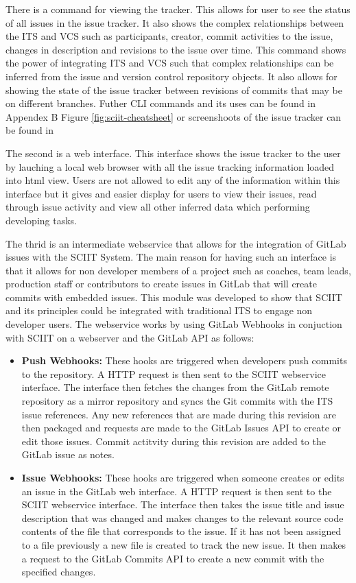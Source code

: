 \documentclass{mproj}
\begin{document}
There is a command for viewing the tracker. This allows for user to see the status of all issues in the issue tracker. It also shows the complex relationships between the ITS and VCS such as participants, creator, commit activities to the issue, changes in description and revisions to the issue over time. This command shows the power of integrating ITS and VCS such that complex relationships can be inferred from the issue and version control repository objects. It also allows for showing the state of the issue tracker between revisions of commits that may be on different branches. Futher CLI commands and its uses can be found in Appendex B Figure \ref{fig:sciit-cheatsheet} or screenshoots of the issue tracker can be found in %

The second is a web interface. This interface shows the issue tracker to the user by lauching a local web browser with all the issue tracking information loaded into html view. Users are not allowed to edit any of the information within this interface but it gives and easier display for users to view their issues, read through issue activity and view all other inferred data which performing developing tasks.

The thrid is an intermediate webservice that allows for the integration of GitLab issues with the SCIIT System. The main reason for having such an interface is that it allows for non developer members of a project such as coaches, team leads, production staff or contributors to create issues in GitLab that will create commits with embedded issues. This module was developed to show that SCIIT and its principles could be integrated with traditional ITS to engage non developer users. The webservice works by using GitLab Webhooks in conjuction with SCIIT on a webserver and the GitLab API as follows:

\begin{itemize}
  \item \textbf{Push Webhooks:} These hooks are triggered when developers push commits to the repository. A HTTP request is then sent to the SCIIT webservice interface. The interface then fetches the changes from the GitLab remote repository as a mirror repository and syncs the Git commits with the ITS issue references. Any new references that are made during this revision are then packaged and requests are made to the GitLab Issues API to create or edit those issues. Commit actitvity during this revision are added to the GitLab issue as notes.
  \item \textbf{Issue Webhooks:} These hooks are triggered when someone creates or edits an issue in the GitLab web interface. A HTTP request is then sent to the SCIIT webservice interface. The interface then takes the issue title and issue description that was changed and makes changes to the relevant source code contents of the file that corresponds to the issue. If it has not been assigned to a file previously a new file is created to track the new issue. It then makes a request to the GitLab Commits API to create a new commit with the specified changes.
\end{itemize}
\end{document}
